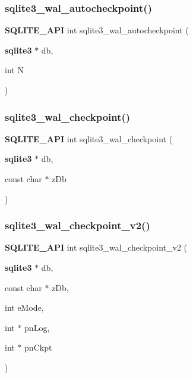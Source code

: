 \subsubsection{sqlite3\_wal\_autocheckpoint()}
{\footnotesize\ttfamily \textbf{ S\+Q\+L\+I\+T\+E\+\_\+\+A\+PI} int sqlite3\+\_\+wal\+\_\+autocheckpoint (\begin{DoxyParamCaption}\item[{\textbf{ sqlite3} $\ast$}]{db,  }\item[{int}]{N }\end{DoxyParamCaption})}

\mbox{\label{sqlite3_8h_a5256a357264a12d3935888280d4b8fa0}} 
\subsubsection{sqlite3\_wal\_checkpoint()}
{\footnotesize\ttfamily \textbf{ S\+Q\+L\+I\+T\+E\+\_\+\+A\+PI} int sqlite3\+\_\+wal\+\_\+checkpoint (\begin{DoxyParamCaption}\item[{\textbf{ sqlite3} $\ast$}]{db,  }\item[{const char $\ast$}]{z\+Db }\end{DoxyParamCaption})}

\mbox{\label{sqlite3_8h_a074441ba2d0426a8684cc2d379e74163}} 
\subsubsection{sqlite3\_wal\_checkpoint\_v2()}
{\footnotesize\ttfamily \textbf{ S\+Q\+L\+I\+T\+E\+\_\+\+A\+PI} int sqlite3\+\_\+wal\+\_\+checkpoint\+\_\+v2 (\begin{DoxyParamCaption}\item[{\textbf{ sqlite3} $\ast$}]{db,  }\item[{const char $\ast$}]{z\+Db,  }\item[{int}]{e\+Mode,  }\item[{int $\ast$}]{pn\+Log,  }\item[{int $\ast$}]{pn\+Ckpt }\end{DoxyParamCaption})}

\mbox{\label{sqlite3_8h_a1d99c4f86dbb61f058a3d1cbe258dde6}} 
